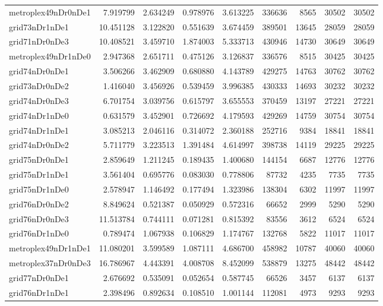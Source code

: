 \begin{longtable}{|l|r|r|r|r|r|r|r|r|}
metroplex49nDr0nDe1 & 7.919799 & 2.634249 & 0.978976 & 3.613225 & 336636 & 8565 & 30502 & 30502 \\
grid73nDr1nDe1 & 10.451128 & 3.122820 & 0.551639 & 3.674459 & 389501 & 13645 & 28059 & 28059 \\
grid71nDr0nDe3 & 10.408521 & 3.459710 & 1.874003 & 5.333713 & 430946 & 14730 & 30649 & 30649 \\
metroplex49nDr1nDe0 & 2.947368 & 2.651711 & 0.475126 & 3.126837 & 336576 & 8515 & 30425 & 30425 \\
grid74nDr0nDe1 & 3.506266 & 3.462909 & 0.680880 & 4.143789 & 429275 & 14763 & 30762 & 30762 \\
grid73nDr0nDe2 & 1.416040 & 3.456926 & 0.539459 & 3.996385 & 430333 & 14693 & 30232 & 30232 \\
grid74nDr0nDe3 & 6.701754 & 3.039756 & 0.615797 & 3.655553 & 370459 & 13197 & 27221 & 27221 \\
grid74nDr1nDe0 & 0.631579 & 3.452901 & 0.726692 & 4.179593 & 429269 & 14759 & 30754 & 30754 \\
grid74nDr1nDe1 & 3.085213 & 2.046116 & 0.314072 & 2.360188 & 252716 & 9384 & 18841 & 18841 \\
grid74nDr0nDe2 & 5.711779 & 3.223513 & 1.391484 & 4.614997 & 398738 & 14119 & 29225 & 29225 \\
grid75nDr0nDe1 & 2.859649 & 1.211245 & 0.189435 & 1.400680 & 144154 & 6687 & 12776 & 12776 \\
grid75nDr1nDe1 & 3.561404 & 0.695776 & 0.083030 & 0.778806 & 87732 & 4235 & 7735 & 7735 \\
grid75nDr1nDe0 & 2.578947 & 1.146492 & 0.177494 & 1.323986 & 138304 & 6302 & 11997 & 11997 \\
grid76nDr0nDe2 & 8.849624 & 0.521387 & 0.050929 & 0.572316 & 66652 & 2999 & 5290 & 5290 \\
grid76nDr0nDe3 & 11.513784 & 0.744111 & 0.071281 & 0.815392 & 83556 & 3612 & 6524 & 6524 \\
grid76nDr1nDe0 & 0.789474 & 1.067938 & 0.106829 & 1.174767 & 132768 & 5822 & 11017 & 11017 \\
metroplex49nDr1nDe1 & 11.080201 & 3.599589 & 1.087111 & 4.686700 & 458982 & 10787 & 40060 & 40060 \\
metroplex37nDr0nDe3 & 16.786967 & 4.443391 & 4.008708 & 8.452099 & 538879 & 13275 & 48442 & 48442 \\
grid77nDr0nDe1 & 2.676692 & 0.535091 & 0.052654 & 0.587745 & 66526 & 3457 & 6137 & 6137 \\
grid76nDr1nDe1 & 2.398496 & 0.892634 & 0.108510 & 1.001144 & 112081 & 4973 & 9293 & 9293 \\

\end{longtable}
